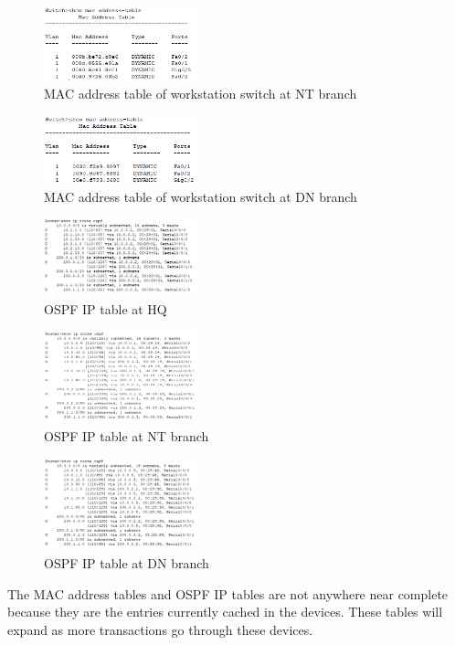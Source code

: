 \begin{figure}[H]
  \centering
  \includegraphics[width=0.4\textwidth]{./assets/mac.ntw.png}
  \caption{MAC address table of workstation switch at NT branch}
\end{figure}

\begin{figure}[H]
  \centering
  \includegraphics[width=0.4\textwidth]{./assets/mac.dnw.png}
  \caption{MAC address table of workstation switch at DN branch}
\end{figure}

\begin{figure}[H]
  \centering
  \includegraphics[width=0.4\textwidth]{./assets/ospf.hq.png}
  \caption{OSPF IP table at HQ}
\end{figure}

\begin{figure}[H]
  \centering
  \includegraphics[width=0.4\textwidth]{./assets/ospf.nt.png}
  \caption{OSPF IP table at NT branch}
\end{figure}

\begin{figure}[H]
  \centering
  \includegraphics[width=0.4\textwidth]{./assets/ospf.dn.png}
  \caption{OSPF IP table at DN branch}
\end{figure}

The MAC address tables and OSPF IP tables are not anywhere near complete because they are the entries currently cached in the devices.
These tables will expand as more transactions go through these devices.
